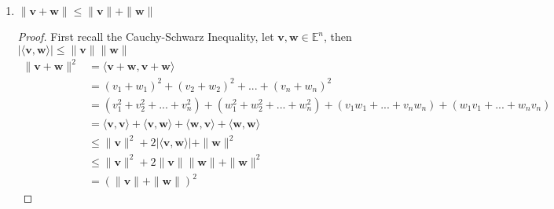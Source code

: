 \documentclass{tufte-book}
\theoremstyle{mytheoremstyle}
\theoremstyle{mylemstyle}
\theoremstyle{mydefstyle}
\begin{document}
\begin{enumerate}
\begin{proof}
\begin{align*}
\|\alpha \mathbf{v} \| &= \sqrt{\langle\alpha\mathbf{v},\alpha\mathbf{v}\rangle} \\
&= \sqrt{(\alpha^2v_1^2 +\alpha^2v_2^2 + \alpha^2v_3^2 +...+\alpha^2v_n^2)} \\
&= \sqrt{\alpha^2(v_1^2 + v_2^2 +v_3^2 +...+v_n^2)} \\
&= |\alpha| \sqrt{(v_1^2 + v_2^2 +v_3^2 +...+v_n^2)} \\
&= |\alpha| \sqrt{\langle \mathbf{v}, \mathbf{v} \rangle} \\
&= |\alpha| \|\mathbf{v}\|
\end{align*}
\end{proof}

\item $\|\mathbf{v} + \mathbf{w} \| \leq \|\mathbf{v}\| + \|\mathbf{w}\|$

\begin{proof}

First recall the Cauchy-Schwarz Inequality, let $\mathbf{v}, \mathbf{w} \in \mathbb{E}^n$, then $|\langle \mathbf{v}, \mathbf{w} \rangle| \leq \|\mathbf{v}\|\|\mathbf{w}\|$
\begin{align*}
\|\mathbf{v} + \mathbf{w} \|^2 &= \langle \mathbf{v}+\mathbf{w},\mathbf{v}+\mathbf{w}\rangle \\
&= (v_1+w_1)^2 + (v_2+w_2)^2 +...+(v_n+w_n)^2\\
&= (v_1^2 + v_2^2 +...+v_n^2) + (w_1^2+w_2^2+...+w_n^2) + (v_1w_1+...+v_nw_n) +(w_1v_1+...+w_nv_n) \\ 
&= \langle \mathbf{v},\mathbf{v}\rangle + \langle \mathbf{v}, \mathbf{w} \rangle + \langle \mathbf{w}, \mathbf{v} \rangle + \langle \mathbf{w},\mathbf{w}\rangle \\
&\leq \|\mathbf{v}\|^2 + 2|\langle \mathbf{v}, \mathbf{w} \rangle| + \|\mathbf{w}\|^2 \\
&\leq \|\mathbf{v}\|^2 + 2\|\mathbf{v}\|\|\mathbf{w}\| + \|\mathbf{w}\|^2 \\
&= (\|\mathbf{v}\| + \|\mathbf{w}\|)^2
\end{align*}

\end{proof}


\end{enumerate}
\end{document}
